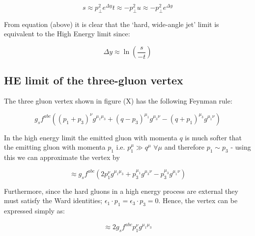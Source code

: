 	\begin{subequations}
		\begin{equation}
			s \approx p_\perp^2 e^{\Delta y}
		\end{equation}
		\begin{equation}
			t \approx -p_\perp^2
		\end{equation}
		\begin{equation}
			u \approx -p_\perp^2 e^{\Delta y}
		\end{equation}
	\end{subequations}

	From equation (above) it is clear that the `hard, wide-angle jet' limit is equivalent to the High Energy limit since:

	\begin{equation}
		\Delta y \approx \ln \left(\frac{s}{-t}\right)
	\end{equation}

	\subsection{HE limit of the three-gluon vertex}
	\label{sub:subsection_name}

	The three gluon vertex shown in figure (X) has the following Feynman rule:

	\begin{equation}
		g_s f^{abc} \left((p_1+p_3)^\nu g^{\mu_1\mu_3} + (q-p_3)^{\mu_1}g^{\mu_3\nu} - (q+p_1)^{\mu_3}g^{\mu_1\nu}\right)
	\end{equation}

	In the high energy limit the emitted gluon with momenta $q$ is much softer that the emitting gluon with momenta $p_1$ i.e. $p_1^\mu \gg q^\mu$  $\forall \mu$ and therefore $p_1\sim p_3$ - using this we can approximate the vertex by

	\begin{equation}
		\approx g_s f^{abc} \left(2p_1^\nu g^{\mu_1\mu_3} + p_3^{\mu_1}g^{\mu_3\nu} - p_3^{\mu_3}g^{\mu_1\nu}\right)
	\end{equation}

	Furthermore, since the hard gluons in a high energy process are external they must satisfy the Ward identities; $\epsilon_1\cdot p_1 = \epsilon_3\cdot p_3 = 0$.  Hence, the vertex can be expressed simply as:

	\begin{equation}
		\approx 2g_s f^{abc}p_1^\nu g^{\mu_1\mu_3}
	\end{equation}

